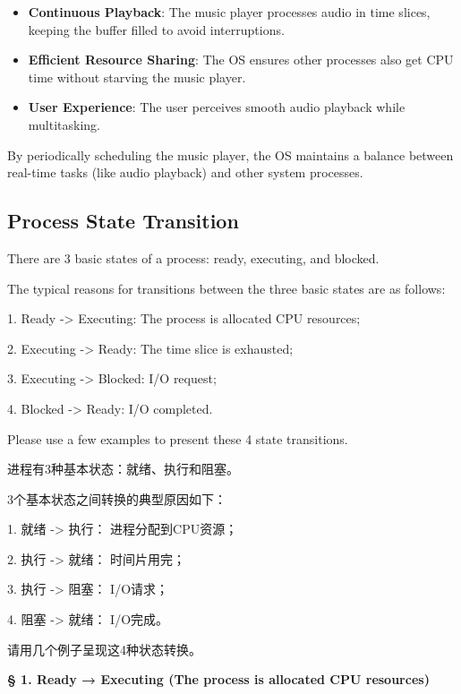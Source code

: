 \documentclass[a4paper]{book}
\newcommand{\sfbf}[1]{{\normalsize\textsf{\textbf{§ #1}}}}
\begin{document}
\begin{itemize}
\item
\textbf{Continuous Playback}: The music player processes audio in time slices, keeping the buffer filled to avoid interruptions.

\item
\textbf{Efficient Resource Sharing}: The OS ensures other processes also get CPU time without starving the music player.

\item
\textbf{User Experience}: The user perceives smooth audio playback while multitasking.

\end{itemize}

By periodically scheduling the music player, the OS maintains a balance between real-time tasks (like audio playback) and other system processes.

\subsection{Process State Transition}

\begin{greenbox}
There are 3 basic states of a process: ready, executing, and blocked. 

The typical reasons for transitions between the three basic states are as follows:

1. Ready -> Executing: The process is allocated CPU resources;

2. Executing -> Ready: The time slice is exhausted;

3. Executing -> Blocked: I/O request;

4. Blocked -> Ready: I/O completed.

Please use a few examples to present these 4 state transitions.
\end{greenbox}

进程有3种基本状态：就绪、执行和阻塞。

3个基本状态之间转换的典型原因如下：

1. 就绪 -> 执行： 进程分配到CPU资源；

2. 执行 -> 就绪： 时间片用完；

3. 执行 -> 阻塞： I/O请求；

4. 阻塞 -> 就绪： I/O完成。

请用几个例子呈现这4种状态转换。

\sfbf{1. Ready → Executing (The process is allocated CPU resources)}
\end{document}
